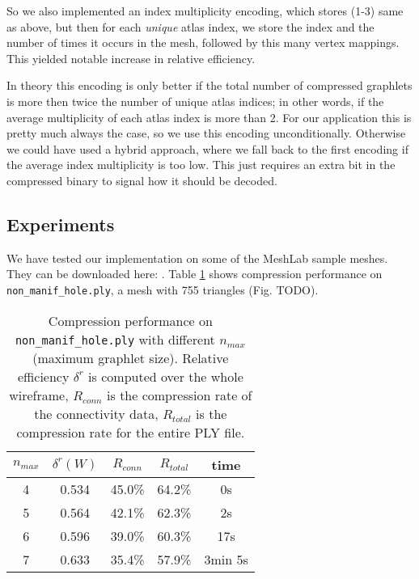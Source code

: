 \documentclass{egpubl}
\begin{document}
So we also implemented an index multiplicity encoding, which stores (1-3) same as above, but then for each \textit{unique} atlas index, we store the index and the number of times it occurs in the mesh, followed by this many vertex mappings. This yielded notable increase in relative efficiency. %

In theory this encoding is only better if the total number of compressed graphlets is more then twice the number of unique atlas indices; in other words, if the average multiplicity of each atlas index is more than 2. For our application this is pretty much always the case, so we use this encoding unconditionally. Otherwise we could have used a hybrid approach, where we fall back to the first encoding if the average index multiplicity is too low. This just requires an extra bit in the compressed binary to signal how it should be decoded.

\subsection{Experiments}

We have tested our implementation on some of the MeshLab sample meshes. They can be downloaded here: .
Table \ref{tab:compression_nonmanif} shows compression performance on \texttt{non\_manif\_hole.ply}, a mesh with 755 triangles (Fig. TODO).

\begin{table}
        \centering
        \begin{tabular}{|c|c|c|c|c|}
        \hline
        $n_{max}$ & $\delta^r(W)$ & $R_{conn}$ & $R_{total}$ & time \\
        \hline
        4 & 0.534 & 45.0\% & 64.2\% & 0s \\ %
        5 & 0.564 & 42.1\% & 62.3\% & 2s \\
        6 & 0.596 & 39.0\% & 60.3\% & 17s \\
        7 & 0.633 & 35.4\% & 57.9\% & 3min 5s \\
        \hline
\end{tabular}
\caption{Compression performance on \texttt{non\_manif\_hole.ply} with different $n_{max}$ (maximum graphlet size). Relative efficiency $\delta^r$ is computed over the whole wireframe, $R_{conn}$ is the compression rate of the connectivity data, $R_{total}$ is the compression rate for the entire PLY file.}
\label{tab:compression_nonmanif}
\end{table}
\end{document}
